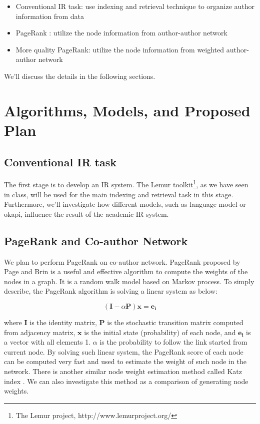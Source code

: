 \documentclass[12pt]{article}
\begin{document}
\begin{itemize}
\item Conventional IR task: use indexing and retrieval technique to organize author information from data
\item PageRank \cite{pagerank99}: utilize the node information from author-author network
\item More quality PageRank: utilize the node information from weighted author-author network
\end{itemize}

We'll discuss the details in the following sections.

\section{Algorithms, Models, and Proposed Plan}

\subsection{Conventional IR task}
The first stage is to develop an IR system.  The Lemur toolkit\footnote{The Lemur project, http://www.lemurproject.org/}, as we have seen in class, will be used for the main indexing and retrieval task in this stage.  Furthermore, we'll investigate how different models, such as language model or okapi, influence the result of the academic IR system.

\subsection{PageRank and Co-author Network}
We plan to perform PageRank on co-author network.  PageRank \cite{pagerank99} proposed by Page and Brin is a useful and effective algorithm to compute the weights of the nodes in a graph.  It is a random walk model based on Markov process.  To simply describe, the PageRank algorithm is solving a linear system as below:

\[
(\mathbf{I} - \alpha \mathbf{P})\mathbf{x} = \mathbf{e_i}
\]

where $\mathbf{I}$ is the identity matrix, $\mathbf{P}$ is the stochastic transition matrix computed from adjacency matrix, $\mathbf{x}$ is the initial state (probability) of each node, and $\mathbf{e_i}$ is a vector with all elements 1.  $\alpha$ is the probability to follow the link started from current node.  By solving such linear system, the PageRank score of each node can be computed very fast and used to estimate the weight of such node in the network.  There is another similar node weight estimation method called Katz index \cite{katz53}.  We can also investigate this method as a comparison of generating node weights.
\end{document}
